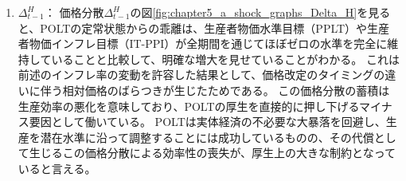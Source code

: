 \begin{enumerate}
        消費者物価インフレ目標（IT-CPI）などで見られたような極端なマイナス方向（デフレ）への下落とは異なり、POLTにおけるインフレ率の変動は、供給ショックに伴う相対価格の調整を促し、生産を目標水準へと導くための必要なプロセスとして機能している。しかしながら、このインフレ率の変動が次項で述べる価格分散の発生を招く要因にもなっている。
    \item
    \label{itm:chapter5_a_shock_policies_polt_Delta_t_minus_1_H}
        \(\Delta_{t-1}^H\)：
        価格分散\(\Delta_{t-1}^H\)の図\ref{fig:chapter5_a_shock_graphs_Delta_H}を見ると、POLTの定常状態からの乖離は、生産者物価水準目標（PPLT）や生産者物価インフレ目標（IT-PPI）が全期間を通じてほぼゼロの水準を完全に維持していることと比較して、明確な増大を見せていることがわかる。
        これは前述のインフレ率の変動を許容した結果として、価格改定のタイミングの違いに伴う相対価格のばらつきが生じたためである。
        この価格分散の蓄積は生産効率の悪化を意味しており、POLTの厚生を直接的に押し下げるマイナス要因として働いている。
        POLTは実体経済の不必要な大暴落を回避し、生産を潜在水準に沿って調整することには成功しているものの、その代償として生じるこの価格分散による効率性の喪失が、厚生上の大きな制約となっていると言える。
\end{enumerate}